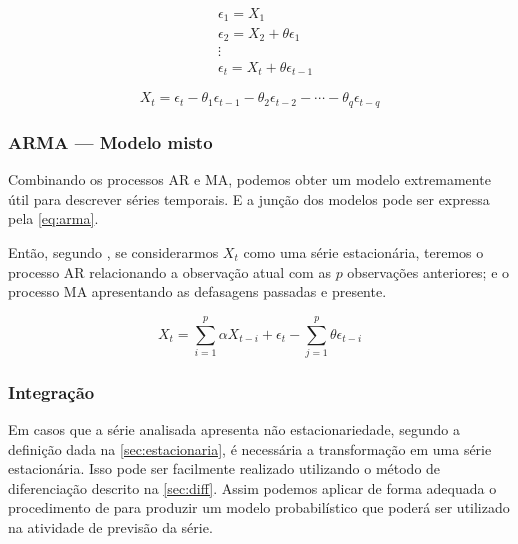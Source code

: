 \documentclass[
    12pt,
    oneside,
    a4paper,
    english,
    brazil
]{abntex2}
\begin{document}
\begin{equation} \label{eq:passeioAleatorio}
    \begin{split}
        & \epsilon_1 = X_1 \\
        & \epsilon_2 = X_2 + \theta \epsilon_1 \\
        & \vdots \\
        & \epsilon_t = X_t + \theta \epsilon_{t-1}
    \end{split}
\end{equation}

\begin{equation}
    \label{eq:pmediasmoveis}
    X_t = \epsilon_t - \theta_1\epsilon_{t-1} - \theta_2\epsilon_{t-2} - \cdots - \theta_{q}\epsilon_{t-q}
\end{equation}

\subsubsection{ARMA --- Modelo misto}

Combinando os processos AR e MA, podemos obter um modelo extremamente útil para
descrever  séries temporais.  E a  junção dos  modelos pode  ser expressa  pela
\autoref{eq:arma}.

Então, segundo , se considerarmos $X_t$  como uma
série estacionária, teremos  o processo AR relacionando a  observação atual com
as  $p$  observações anteriores; e  o  processo  MA apresentando as  defasagens
passadas e presente.

\begin{equation}
    \label{eq:arma}
    X_t = \sum_{i = 1}^{p}{\alpha X_{t-i}} + \epsilon_t - \sum_{j = 1}^{p}{\theta \epsilon_{t-i}}
\end{equation}

\subsubsection{Integração}

Em  casos  que a  série  analisada  apresenta  não estacionariedade, segundo  a
definição dada  na \autoref{sec:estacionaria}, é necessária  a transformação em
uma série estacionária. Isso pode  ser facilmente realizado utilizando o método
de  diferenciação  descrito na  \autoref{sec:diff}.  Assim  podemos aplicar  de
forma  adequada o  procedimento  de   para  produzir um  modelo
probabilístico que poderá ser utilizado na atividade de previsão da série.
\end{document}
